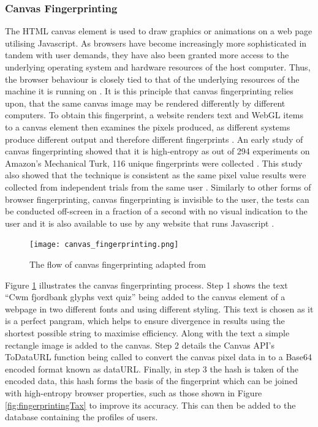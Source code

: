 \documentclass[12pt]{article}
\begin{document}
\subsubsection{Canvas Fingerprinting}
The HTML canvas element is used to draw graphics or animations on a web page utilising Javascript. As browsers have become increasingly more sophisticated in tandem with user demands, they have also been granted more access to the underlying operating system and hardware resources of the host computer. Thus, the browser behaviour is closely tied to that of the underlying resources of the machine it is running on \parencite{canvasFP}. It is this principle that canvas fingerprinting relies upon, that the same canvas image may be rendered differently by different computers. To obtain this fingerprint, a website renders text and WebGL items to a canvas element then examines the pixels produced, as different systems produce different output and therefore different fingerprints \parencite{canvasFP}. An early study of canvas fingerprinting showed that it is high-entropy as out of 294 experiments on Amazon's Mechanical Turk, 116 unique fingerprints were collected \parencite{canvasFP}. This study also showed that the technique is consistent as the same pixel value results were collected from independent trials from the same user \parencite{canvasFP}. Similarly to other forms of browser fingerprinting, canvas fingerprinting is invisible to the user, the tests can be conducted off-screen in a fraction of a second with no visual indication to the user and it is also available to use by any website that runs Javascript \parencite{canvasFP}. \\

\begin{figure}[H]
    \centering
    \texttt{[image: canvas\_fingerprinting.png]}
    \caption{The flow of canvas fingerprinting adapted from \parencite{webNeverForgets}}
    \label{fig:canvas_fingerprinting}
\end{figure}

Figure \ref{fig:canvas_fingerprinting} illustrates the canvas fingerprinting process. Step 1 shows the text ``Cwm fjordbank glyphs vext quiz” being added to the canvas element of a webpage in two different fonts and using different styling. This text is chosen as it is a perfect pangram, which helps to ensure divergence in results using the shortest possible string to maximise efficiency. Along with the text a simple rectangle image is added to the canvas. Step 2 details the Canvas API’s ToDataURL function being called to convert the canvas pixel data in to a Base64 encoded format known as dataURL. Finally, in step 3 the hash is taken of the encoded data, this hash forms the basis of the fingerprint which can be joined with high-entropy browser properties, such as those shown in Figure \ref{fig:fingerprintingTax} to improve its accuracy. This can then be added to the database containing the profiles of users. \\     
\end{document}
